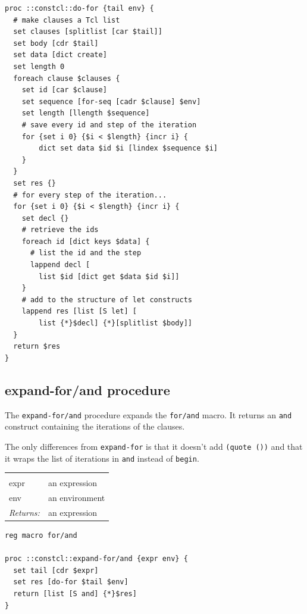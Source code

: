 \documentclass[a5paper,draft]{memoir}
\begin{document}
\begin{lstlisting}
proc ::constcl::do-for {tail env} {
  # make clauses a Tcl list
  set clauses [splitlist [car $tail]]
  set body [cdr $tail]
  set data [dict create]
  set length 0
  foreach clause $clauses {
    set id [car $clause]
    set sequence [for-seq [cadr $clause] $env]
    set length [llength $sequence]
    # save every id and step of the iteration
    for {set i 0} {$i < $length} {incr i} {
        dict set data $id $i [lindex $sequence $i]
    }
  }
  set res {}
  # for every step of the iteration...
  for {set i 0} {$i < $length} {incr i} {
    set decl {}
    # retrieve the ids
    foreach id [dict keys $data] {
      # list the id and the step
      lappend decl [
        list $id [dict get $data $id $i]]
    }
    # add to the structure of let constructs
    lappend res [list [S let] [
        list {*}$decl] {*}[splitlist $body]]
  }
  return $res
}
\end{lstlisting}

\subsection{expand-for/and procedure}
\label{expandforand-procedure}

The \texttt{expand-for/and} procedure expands the \texttt{for/and} macro. It returns an \texttt{and} construct containing the iterations of the clauses.

The only differences from \texttt{expand-for} is that it doesn't add \texttt{(quote ())} and that it wraps the list of iterations in \texttt{and} instead of \texttt{begin}.

\noindent\begin{tabular}{ |p{1.9cm} p{6.5cm}| }
\hline
\rowcolor[HTML]{CCCCCC} \multicolumn{2}{|l|}{\textbf{expand-for/and (internal)}} \\
expr & an expression \\
env & an environment \\
\textit{Returns:} & an expression \\
\hline
\end{tabular}

\begin{lstlisting}
reg macro for/and

proc ::constcl::expand-for/and {expr env} {
  set tail [cdr $expr]
  set res [do-for $tail $env]
  return [list [S and] {*}$res]
}
\end{lstlisting}
\end{document}

